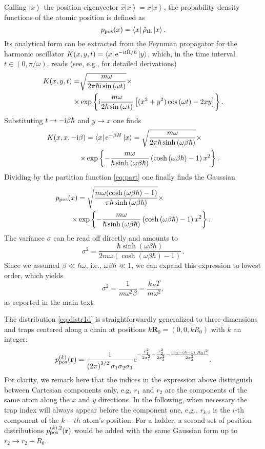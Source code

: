 \documentclass[prl,aps,twocolumn,showpacs,superscriptaddress,longbibliography]{revtex4-1}
\newcommand{\be}{\begin{equation}}
\newcommand{\ee}{\end{equation}}
\newcommand{\rmi}{{\rm{i}}}
\newcommand{\rme}[1]{{\rm{e}}^{#1}}
\newcommand{\lt}{\left(}
\newcommand{\rt}{\right)}
\newcommand{\lqq}{\left[}
\newcommand{\rqq}{\right]}
\newcommand{\lan}{\left\langle}
\newcommand{\ran}{\right\rangle}
\newcommand{\ket}[1]{\left| #1 \ran}
\newcommand{\bra}[1]{\lan #1 \right|}
\newcommand{\cosa}[1]{\cos \left(  #1 \right)}
\newcommand{\sina}[1]{\sin \left(  #1 \right)}
\newcommand{\cosha}[1]{\cosh \left(  #1 \right)}
\newcommand{\sinha}[1]{\sinh \left(  #1 \right)}
\newcommand{\op}[1]{\mathrm{\hat{#1}}}
\begin{document}
Calling $\ket{x}$ the position eigenvector $\hat{x} \ket{x} = x \ket{x}$, the probability density functions of the atomic position is defined as
\be
	p_{\rm pos}(x) = \bra{x} \op \rho_{\rm th} \ket{x}.
\ee
Its analytical form can be extracted from the Feynman propagator for the harmonic oscillator $K(x,y,t) = \bra{x}  \rme{-\rmi t \op H / \hbar}   \ket{y}$, which, in the time interval $t \in (0, \pi/\omega)$, reads (see, e.g., \cite{kernel1, kernel2} for detailed derivations)
\be
\begin{split}
	K(x,y,t) = &\sqrt{\frac{m\omega}{2\pi \hbar \rmi \sina{\omega t}}}  \times \\
	\times & \exp \left\{  \rmi\frac{ m \omega}{2\hbar \sina{\omega t}} \lqq  (x^2 + y^2) \cosa{\omega t} - 2xy  \rqq  \right\}.
\end{split}
\ee 
Substituting $t \to -\rmi\beta \hbar$ and $y \to x$ one finds
\be
\begin{split}
	K(x,x,-\rmi\beta) & = \bra{x}  \rme{ - \beta H}   \ket{x} = \sqrt{\frac{m\omega}{2\pi \hbar \sinha{\omega \beta \hbar}}} \times \\
	\times & \exp \left\{  - \frac{ m \omega}{\hbar \sinha{\omega \beta \hbar}} \lt \cosha{\omega \beta \hbar} - 1  \rt x^2  \right\}.
\end{split}
\ee
Dividing by the partition function \eqref{eq:part} one finally finds the Gaussian
\be
\begin{split}
	p_{\rm pos}(x) & = \sqrt{\frac{m\omega ( \cosha{\omega \beta \hbar}-1) }{\pi \hbar \sinha{\omega \beta \hbar}}} \times \\
	\times & \exp \left\{  - \frac{ m \omega}{\hbar \sinha{\omega \beta \hbar}} \lt \cosha{\omega \beta \hbar} - 1  \rt x^2  \right\}.
	\label{eq:distr1d}
\end{split}
\ee
The variance $\sigma$ can be read off directly and amounts to
\be
	\sigma^2  = \frac{\hbar  \sinha{\omega \beta \hbar}}{ 2 m \omega (\cosha{\omega \beta \hbar}-1) }\,.
\ee
Since we assumed $\beta \ll \hbar \omega$, i.e., $\omega \beta \hbar \ll 1$, we can expand this expression to lowest order, which yields
\be
	\sigma^2 = \frac{1}{m \omega^2 \beta} = \frac{k_B T}{m \omega^2},
\ee
as reported in the main text. 

The distribution \eqref{eq:distr1d} is straightforwardly generalized to three-dimensions and traps centered along a chain at positions $k\mathbf{R}_0 = (0,0,kR_0)$ with $k$ an integer:
\be
	p^{(k)}_{\rm pos}(\mathbf{r}) = \frac{1}{\lt 2\pi \rt^{3/2} \sigma_1 \sigma_2 \sigma_3} %
	\rme{-  \frac{r_1^2}{2\sigma_1^2} -\frac{r_2^2}{2\sigma_2^2} -\frac{(r_3 - (k-1) \cdot R_0)^2}{2\sigma_3^2} } .
	\label{eq:distr0}
\ee
For clarity, we remark here that the indices in the expression above distinguish between Cartesian components only, e.g, $r_1$ and $r_2$ are the components of the same atom along the $x$ and $y$ directions. In the following, when necessary the trap index will always appear before the component one, e.g., $r_{k,i}$ is the $i$-th component of the $k-th$ atom's position.
For a ladder, a second set of position distributions $p^{(k),2}_{\rm pos}(\mathbf{r})$ would be added with the same Gaussian form up to $r_2 \to r_2 - R_0$.
\end{document}
